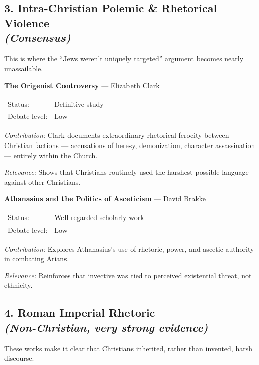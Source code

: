\documentclass[10pt,twoside,openany]{book}
\begin{document}
\subsection{\texorpdfstring{3. Intra-Christian Polemic \& Rhetorical Violence\\{\normalfont\small\itshape (Consensus)}}{3. Intra-Christian Polemic \& Rhetorical Violence (Consensus)}}

This is where the ``Jews weren't uniquely targeted'' argument becomes
nearly unassailable.

\medskip

\textbf{The Origenist Controversy} --- Elizabeth Clark

\begin{tabular}{@{}ll@{}}
Status: & Definitive study \\
Debate level: & Low
\end{tabular}

\emph{Contribution:}
Clark documents extraordinary rhetorical ferocity between Christian
factions --- accusations of heresy, demonization, character
assassination --- entirely within the Church.

\emph{Relevance:}
Shows that Christians routinely used the harshest possible language
against other Christians.

\medskip

\textbf{Athanasius and the Politics of Asceticism} --- David Brakke

\begin{tabular}{@{}ll@{}}
Status: & Well-regarded scholarly work \\
Debate level: & Low
\end{tabular}

\emph{Contribution:}
Explores Athanasius's use of rhetoric, power, and ascetic authority
in combating Arians.

\emph{Relevance:}
Reinforces that invective was tied to perceived existential threat,
not ethnicity.

\subsection{\texorpdfstring{4. Roman Imperial Rhetoric\\{\normalfont\small\itshape (Non-Christian, very strong evidence)}}{4. Roman Imperial Rhetoric (Non-Christian, very strong evidence)}}

These works make it clear that Christians inherited, rather than
invented, harsh discourse.
\end{document}

